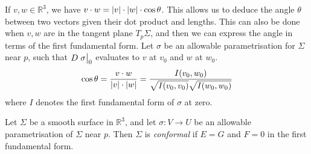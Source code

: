 If \( v,w \in \mathbb R^3 \), we have \( v \cdot w = \abs{v} \cdot \abs{w} \cdot \cos\theta \).
This allows us to deduce the angle \( \theta \) between two vectors given their dot product and lengths.
This can also be done when \( v,w \) are in the tangent plane \( T_p \Sigma \), and then we can express the angle in terms of the first fundamental form.
Let \( \sigma \) be an allowable parametrisation for \( \Sigma \) near \( p \), such that \( D\eval{\sigma}_0 \) evaluates to \( v \) at \( v_0 \) and \( w \) at \( w_0 \).
\[ \cos \theta = \frac{v \cdot w}{\abs{v} \cdot \abs{w}} = \frac{I(v_0, w_0)}{\sqrt{I(v_0,v_0)} \sqrt{I(w_0,w_0)}} \]
where \( I \) denotes the first fundamental form of \( \sigma \) at zero.
\begin{lemma}
	Let \( \Sigma \) be a smooth surface in \( \mathbb R^3 \), and let \( \sigma \colon V \to U \) be an allowable parametrisation of \( \Sigma \) near \( p \).
	Then \( \Sigma \) is \textit{conformal} if \( E = G \) and \( F = 0 \) in the first fundamental form.
\end{lemma}
